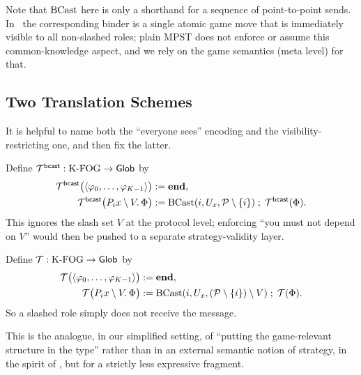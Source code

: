 Note that $\mathrm{BCast}$ here is only a shorthand for a sequence of point-to-point sends. In \KFOL\ the corresponding binder is a single atomic game move that is immediately visible to all non-slashed roles; plain MPST does not enforce or assume this common-knowledge aspect, and we rely on the game semantics (meta level) for that.

\subsection{Two Translation Schemes}
It is helpful to name both the ``everyone sees'' encoding and the visibility-restricting one, and then fix the latter.

\begin{definition}
\label{def:mpst-bcast}
Define $\mathcal{T}^{\mathsf{bcast}} : \mathrm{K\text{-}FOG} \to \mathsf{Glob}$ by
\[
\begin{aligned}
\mathcal{T}^{\mathsf{bcast}}\bigl(\langle \varphi_0,\dots,\varphi_{K-1}\rangle\bigr)
  &:= \mathbf{end},\\
\mathcal{T}^{\mathsf{bcast}}\bigl(P_i x \setminus V.\,\Phi\bigr)
  &:= \mathrm{BCast}(i,U_x,\mathcal{P} \setminus \{i\}) \;;\; \mathcal{T}^{\mathsf{bcast}}(\Phi).
\end{aligned}
\]
This ignores the slash set $V$ at the protocol level; enforcing ``you must not depend on $V$'' would then be pushed to a separate strategy-validity layer.
\end{definition}

\begin{definition}
\label{def:mpst-vis}
Define $\mathcal{T} : \mathrm{K\text{-}FOG} \to \mathsf{Glob}$ by
\[
\begin{aligned}
\mathcal{T}\bigl(\langle \varphi_0,\dots,\varphi_{K-1}\rangle\bigr)
  &:= \mathbf{end},\\
\mathcal{T}\bigl(P_i x \setminus V.\,\Phi\bigr)
  &:= \mathrm{BCast}(i,U_x,(\mathcal{P} \setminus \{i\}) \setminus V) \;;\; \mathcal{T}(\Phi).
\end{aligned}
\]
So a slashed role simply does not receive the message.
\end{definition}

This is the analogue, in our simplified setting, of ``putting the game-relevant structure in the type'' rather than in an external semantic notion of strategy, in the spirit of \cite{CastellanYoshidaSessionGame}, but for a strictly less expressive fragment.

